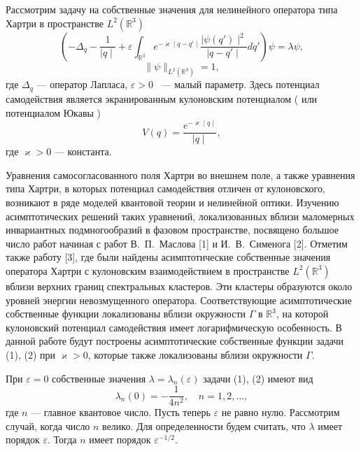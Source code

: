
\vzmscaption

Рассмотрим задачу на собственные значения для нелинейного
оператора типа Хартри в  пространстве $L^2(\mathbb{R}^3)$
\begin{equation}
( -{\Delta}_q-\frac {1}{\mid q \mid}+ \varepsilon \int_{\mathbb{R}^3}  e^{-\varkappa \mid q-q' \mid}\frac {\mid \psi(q') \mid^2}
{\mid q-q' \mid}dq')\psi=\lambda\psi,
\end{equation}
\begin{equation}
\|\psi\|_{L^2(\mathbb{R}^3)}=1,
\end{equation}
где  ${\Delta}_q $ --- оператор Лапласа, $\varepsilon > 0 $ ~--- малый параметр. Здесь потенциал
самодействия является экранированным кулоновским потенциалом ( или потенциалом Юкавы  )
$$
V(q)=\frac {e^{-\varkappa \mid q \mid}}{ \mid q \mid},
$$
где $\varkappa > 0 $  --- константа.

Уравнения самосогласованного поля Хартри во внешнем поле, а также уравнения типа Хартри, в которых потенциал
самодействия отличен от кулоновского, возникают в ряде моделей квантовой теории и нелинейной оптики.
Изучению асимптотических решений таких уравнений,  локализованных вблизи маломерных
инвариантных подмногообразий в фазовом пространстве, посвящено большое число работ начиная с работ В.~П.~Маслова [1]  и И.~В.~Сименога [2].
Отметим также работу [3], где были найдены асимптотические собственные значения
оператора Хартри  с кулоновским взаимодействием в пространстве $L^2(\mathbb{R}^3)$
вблизи верхних границ спектральных кластеров. Эти кластеры
образуются около уровней энергии  невозмущенного оператора.  Соответствующие асимптотические собственные функции
локализованы вблизи окружности   $ \Gamma $ в $\mathbb{R}^3$, на которой кулоновский потенциал самодействия имеет
логарифмическую особенность.  В данной работе будут
построены асимптотические собственные функции задачи  (1), (2) при  $\varkappa > 0 $, которые также локализованы вблизи
окружности $ \Gamma $.

 При $\varepsilon = 0 $ собственные значения
 $\lambda=\lambda_ n (\varepsilon) $   задачи (1), (2) имеют вид
 $$
\lambda_ n (0)=-\frac {1}{4n^2}, \quad  n=1,2,\dots ,
$$
где $ n $ --- главное квантовое число. Пусть теперь $\varepsilon $ не равно нулю.
 Рассмотрим случай, когда число $n$ велико.
Для определенности будем считать, что $\lambda$ имеет порядок
 $\varepsilon$. Тогда $n$  имеет порядок    $\varepsilon^{-1/2}$.

